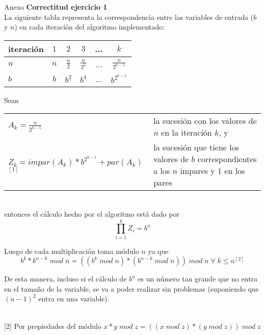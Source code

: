 	\begin{section}{Anexo}
		\textbf{Correctitud ejercicio 1}\\

		La siguiente tabla representa la correspondencia entre las variables de entrada ($b$ y $n$) en 
		cada iteración del algoritmo implementado:

		\vspace{0.5cm}
		\begin{center}
		\begin{tabular}{|l|c|c|c|c|c|}
			\hline
			iteración   & $1$ & $2$           & $3$             & ... & $k$ \\
			\hline
			$n$         & $n$ & $\frac{n}{2}$ & $\frac{n}{2^2}$ & ... & $\frac{n}{2^{k-1}}$ \\
			\hline
			$b$         & $b$ & $b^2$         & $b^4$           & ... & $b^{2^{k-1}}$ \\
			\hline
		\end{tabular}
		\end{center}

		\vspace{0.5cm}
		\noindent Sean \\
		\indent
		\begin{tabular}{lp{6cm}}
			$A_k = \frac{n}{2^{k-1}}$ & la sucesión con los valores de $n$ en la iteración $k$, y \\
			$Z_k = impar(A_k) * b^{2^{k-1}} + par( A_k )$ $^{[1]}$ & la sucesión que tiene los valores de $b$ corres\-pondientes a los $n$ impares y $1$ en los pares
		\end{tabular} \\
		\vspace{0.2cm}
		entonces el cálculo hecho por el algoritmo está dado por 
		$$\displaystyle\prod_{i=1}^k Z_i = b^n$$

		Luego de cada multiplicación toma módulo $n$ ya que
			$$b^k * b^{n-k}\; mod\;n = ((b^k\;mod\;n)*(b^{n-k}\;mod\;n))\;mod\;n\;\forall\;k\leq n ^{[2]}$$ 

		De esta manera, incluso si el cálculo de $b^n$ es un número tan grande que no entra en el 
		tamaño de la variable, se va a poder realizar sin problemas (suponiendo que $(n-1)^2$ entra 
		en una variable).


		\vspace{0.5cm}
		 \\
		\vspace{0.5cm}
		{\footnotesize [2] Por propiedades del módulo $x*y\; mod \; z = ((x\; mod\; z)*(y\; mod\; z))\;mod\; z$ } \\
	\end{section}
